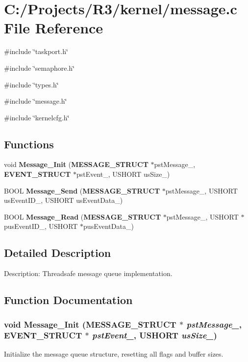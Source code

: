 \section{C:/Projects/R3/kernel/message.c File Reference}
\label{message_8c}
{\ttfamily \#include \char`\"{}taskport.h\char`\"{}}\par
{\ttfamily \#include \char`\"{}semaphore.h\char`\"{}}\par
{\ttfamily \#include \char`\"{}types.h\char`\"{}}\par
{\ttfamily \#include \char`\"{}message.h\char`\"{}}\par
{\ttfamily \#include \char`\"{}kernelcfg.h\char`\"{}}\par
\subsection*{Functions}
\begin{DoxyCompactItemize}
\item 
void {\bf Message\_\-Init} ({\bf MESSAGE\_\-STRUCT} $\ast$pstMessage\_\-, {\bf EVENT\_\-STRUCT} $\ast$pstEvent\_\-, USHORT usSize\_\-)
\item 
BOOL {\bf Message\_\-Send} ({\bf MESSAGE\_\-STRUCT} $\ast$pstMessage\_\-, USHORT usEventID\_\-, USHORT usEventData\_\-)
\item 
BOOL {\bf Message\_\-Read} ({\bf MESSAGE\_\-STRUCT} $\ast$pstMessage\_\-, USHORT $\ast$pusEventID\_\-, USHORT $\ast$pusEventData\_\-)
\end{DoxyCompactItemize}


\subsection{Detailed Description}
Description: Threadsafe message queue implementation. 

\subsection{Function Documentation}
\subsubsection[{Message\_\-Init}]{\setlength{\rightskip}{0pt plus 5cm}void Message\_\-Init ({\bf MESSAGE\_\-STRUCT} $\ast$ {\em pstMessage\_\-}, \/  {\bf EVENT\_\-STRUCT} $\ast$ {\em pstEvent\_\-}, \/  USHORT {\em usSize\_\-})}\label{message_8c_aa46631cdd516a3af7b515fb3d34872c8}
Initialize the message queue structure, resetting all flags and buffer sizes.


